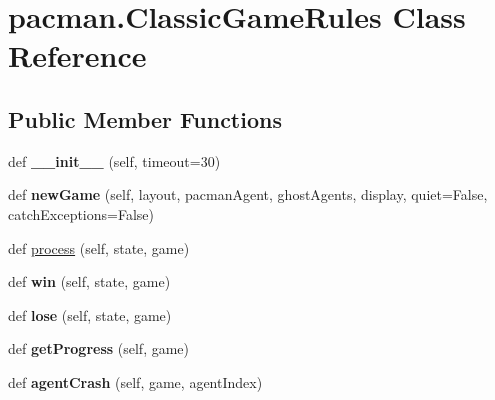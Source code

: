 \hypertarget{classpacman_1_1_classic_game_rules}{}\section{pacman.\+Classic\+Game\+Rules Class Reference}
\label{classpacman_1_1_classic_game_rules}
\subsection*{Public Member Functions}
\begin{DoxyCompactItemize}
\item 
\mbox{\label{classpacman_1_1_classic_game_rules_a545d789125db96710d31230ebf9d989c}} 
def {\bfseries \+\_\+\+\_\+init\+\_\+\+\_\+} (self, timeout=30)
\item 
\mbox{\label{classpacman_1_1_classic_game_rules_a19c2586ef3652dfd0f163270a1f030c2}} 
def {\bfseries new\+Game} (self, layout, pacman\+Agent, ghost\+Agents, display, quiet=False, catch\+Exceptions=False)
\item 
def \hyperlink{classpacman_1_1_classic_game_rules_aa61bf270cf8e333d1aa805106afb08f9}{process} (self, state, game)
\item 
\mbox{\label{classpacman_1_1_classic_game_rules_a04915c8a8ce4140b62e3304dd7fa1957}} 
def {\bfseries win} (self, state, game)
\item 
\mbox{\label{classpacman_1_1_classic_game_rules_a7e16b67534a309cbdfb387df27647d84}} 
def {\bfseries lose} (self, state, game)
\item 
\mbox{\label{classpacman_1_1_classic_game_rules_aad38e1c704a99302196ad3d39fc5c7b7}} 
def {\bfseries get\+Progress} (self, game)
\item 
\mbox{\label{classpacman_1_1_classic_game_rules_a4164536264d312b0412be9e944e40fa1}} 
def {\bfseries agent\+Crash} (self, game, agent\+Index)
\item 
\mbox{\label{classpacman_1_1_classic_game_rules_a4cd03038895fae98ef88a87bd7021aa2}} 

\end{DoxyCompactItemize}
